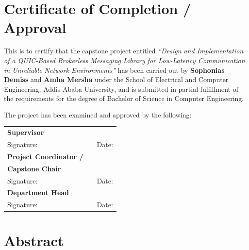 \documentclass[12pt, a4paper, oneside]{report}
\begin{document}
\chapter*{Certificate of Completion / Approval}

This is to certify that the capstone project entitled \textit{``Design and Implementation of a QUIC-Based Brokerless Messaging Library for Low-Latency Communication in Unreliable Network Environments''} has been carried out by \textbf{Sophonias Demiss} and \textbf{Amha Mersha} under the School of Electrical and Computer Engineering, Addis Ababa University, and is submitted in partial fulfillment of the requirements for the degree of Bachelor of Science in Computer Engineering.

The project has been examined and approved by the following:

\vspace{1.5cm}
\noindent
\begin{tabular}{p{4.5cm} p{5.5cm} p{3.5cm}}
  \textbf{Supervisor} & & \\[0.8cm]
  Signature: & \hspace{5cm} & Date: \hspace{2.5cm} \\[1.2cm]

  \textbf{Project Coordinator /} & & \\
  \textbf{Capstone Chair} & & \\[0.8cm]
  Signature: & \hspace{5cm} & Date: \hspace{2.5cm} \\[1.2cm]

  \textbf{Department Head} & & \\[0.8cm]
  Signature: & \hspace{5cm} & Date: \hspace{2.5cm} \\[1.2cm]
\end{tabular}

\chapter*{Abstract}
\end{document}
